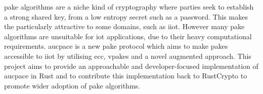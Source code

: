 \gls{pake} algorithms are a niche kind of cryptography where parties seek
to establish a strong shared key, from a low entropy secret such as a password.
This makes the particularly attractive to some domains, such as \gls{iiot}.
However many \gls{pake} algorithms are unsuitable for \gls{iot} applications, due
to their heavy computational requirements. \gls{aucpace} is a new \gls{pake}
protocol which aims to make \glspl{pake} accessible to \gls{iiot} by utilising
\gls{ecc}, \glspl{vpake} and a novel augmented approach. This project aims to
provide an approachable and developer-focused implementation of \gls{aucpace}
in Rust and to contribute this implementation back to RustCrypto to promote wider
adoption of \gls{pake} algorithms.
